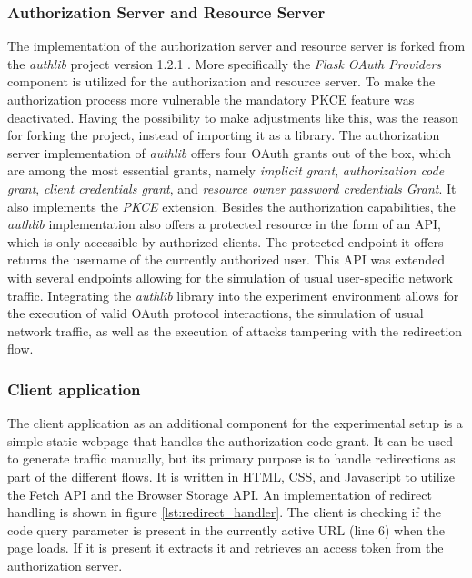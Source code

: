 \subsubsection{Authorization Server and Resource Server}
The implementation of the authorization server and resource server is forked from the \emph{authlib} project version 1.2.1 \cite{authlib2023}. More specifically the \emph{Flask OAuth Providers} component is utilized for the authorization and resource server. To make the authorization process more vulnerable the mandatory PKCE feature was deactivated. Having the possibility to make adjustments like this, was the reason for forking the project, instead of importing it as a library. The authorization server implementation of \emph{authlib} offers four OAuth grants out of the box, which are among the most essential grants, namely \emph{implicit grant}, \emph{authorization code grant}, \emph{client credentials grant}, and \emph{resource owner password credentials Grant}. It also implements the \emph{PKCE} extension. Besides the authorization capabilities, the \emph{authlib} implementation also offers a protected resource in the form of an API, which is only accessible by authorized clients. The protected endpoint it offers returns the username of the currently authorized user. This API was extended with several endpoints allowing for the simulation of usual user-specific network traffic. Integrating the \emph{authlib} library into the experiment environment allows for the execution of valid OAuth protocol interactions, the simulation of usual network traffic, as well as the execution of attacks tampering with the redirection flow.

\subsubsection{Client application}
The client application as an additional component for the experimental setup is a simple static webpage that handles the authorization code grant. It can be used to generate traffic manually, but its primary purpose is to handle redirections as part of the different flows. It is written in HTML, CSS, and Javascript to utilize the Fetch API and the Browser Storage API. An implementation of redirect handling is shown in figure \ref{lst:redirect_handler}. The client is checking if the code query parameter is present in the currently active URL (line 6) when the page loads. If it is present it extracts it and retrieves an access token from the authorization server.

